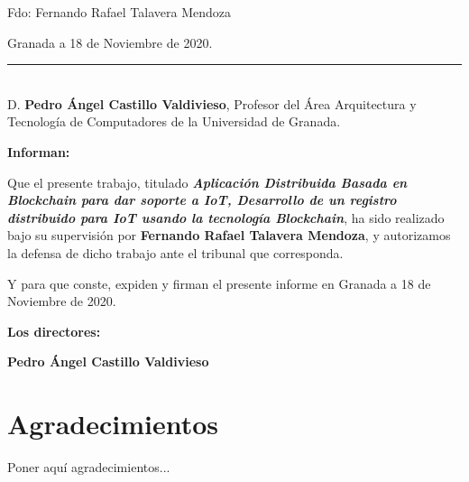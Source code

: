 \noindent Fdo: Fernando Rafael Talavera Mendoza

\vspace{2cm}

\begin{flushright}
Granada a 18 de Noviembre de 2020.
\end{flushright}
\clearpage


\newpage
\thispagestyle{empty}

\noindent\rule[-1ex]{\textwidth}{2pt}\\[4.5ex]

D. \textbf{Pedro Ángel Castillo Valdivieso}, Profesor del Área Arquitectura y Tecnología de Computadores de la Universidad de Granada.

\vspace{0.5cm}

\textbf{Informan:}

\vspace{0.5cm}

Que el presente trabajo, titulado \textit{\textbf{Aplicación Distribuida Basada en Blockchain para dar soporte a IoT, Desarrollo de un registro distribuido 
para IoT usando la tecnología Blockchain}}, ha sido realizado bajo su supervisión por \textbf{Fernando Rafael Talavera Mendoza}, y autorizamos la 
defensa de dicho trabajo ante el tribunal que corresponda.

\vspace{0.5cm}

Y para que conste, expiden y firman el presente informe en Granada a 18 de Noviembre de 2020.

\vspace{1cm}

\textbf{Los directores:}

\vspace{5cm}

\noindent \textbf{Pedro Ángel Castillo Valdivieso}

\newpage
\thispagestyle{empty}

\section*{Agradecimientos}
\thispagestyle{empty}
\vspace{1cm}


Poner aquí agradecimientos...

